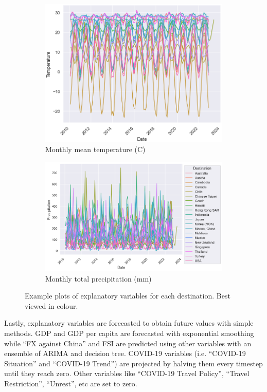 \documentclass{article}
\begin{document}
\begin{figure}
\begin{subfigure}[b]{0.42\textwidth}
         \includegraphics[width=\textwidth]{images/monthly temperature.png}
         \caption{Monthly mean temperature (\degree C)}
     \end{subfigure}
     \begin{subfigure}[b]{0.55\textwidth}
         \centering
         \includegraphics[width=\textwidth]{images/monthly precipitation.png}
         \caption{Monthly total precipitation (mm)}
     \end{subfigure}
    \caption{Example plots of explanatory variables for each destination. Best viewed in colour.}
    \label{fig:expvar}
\end{figure}

Lastly, explanatory variables are forecasted to obtain future values with simple methods. GDP and GDP per capita are forecasted with exponential smoothing \cite{winterexp1960} while ``FX against China'' and FSI are predicted using other variables with an ensemble of ARIMA and decision tree. COVID-19 variables (i.e. ``COVID-19 Situation'' and ``COVID-19 Trend'') are projected by halving them every timestep until they reach zero. Other variables like ``COVID-19 Travel Policy'', ``Travel Restriction'', ``Unrest'', etc are set to zero.
\end{document}
